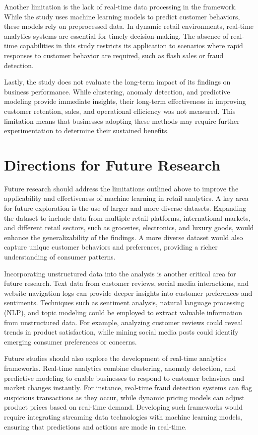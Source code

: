 \documentclass[12pt, a4paper,twoside]{report}
\theoremstyle{plain} %
\theoremstyle{definition} %
\theoremstyle{remark} %
\numberwithin{equation}{chapter}
\begin{document}
Another limitation is the lack of real-time data processing in the framework. While the study uses machine learning models to predict customer behaviors, these models rely on preprocessed data. In dynamic retail environments, real-time analytics systems are essential for timely decision-making. The absence of real-time capabilities in this study restricts its application to scenarios where rapid responses to customer behavior are required, such as flash sales or fraud detection.

Lastly, the study does not evaluate the long-term impact of its findings on business performance. While clustering, anomaly detection, and predictive modeling provide immediate insights, their long-term effectiveness in improving customer retention, sales, and operational efficiency was not measured. This limitation means that businesses adopting these methods may require further experimentation to determine their sustained benefits.

\section{Directions for Future Research}

Future research should address the limitations outlined above to improve the applicability and effectiveness of machine learning in retail analytics. A key area for future exploration is the use of larger and more diverse datasets. Expanding the dataset to include data from multiple retail platforms, international markets, and different retail sectors, such as groceries, electronics, and luxury goods, would enhance the generalizability of the findings. A more diverse dataset would also capture unique customer behaviors and preferences, providing a richer understanding of consumer patterns.

Incorporating unstructured data into the analysis is another critical area for future research. Text data from customer reviews, social media interactions, and website navigation logs can provide deeper insights into customer preferences and sentiments. Techniques such as sentiment analysis, natural language processing (NLP), and topic modeling could be employed to extract valuable information from unstructured data. For example, analyzing customer reviews could reveal trends in product satisfaction, while mining social media posts could identify emerging consumer preferences or concerns.

Future studies should also explore the development of real-time analytics frameworks. Real-time analytics combine clustering, anomaly detection, and predictive modeling to enable businesses to respond to customer behaviors and market changes instantly. For instance, real-time fraud detection systems can flag suspicious transactions as they occur, while dynamic pricing models can adjust product prices based on real-time demand. Developing such frameworks would require integrating streaming data technologies with machine learning models, ensuring that predictions and actions are made in real-time.
\end{document}
